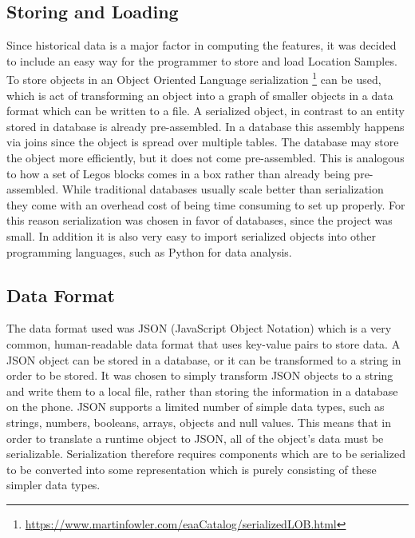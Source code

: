 \subsection{Storing and Loading}
Since historical data is a major factor in computing the features, it was decided to include an easy way for the programmer to store and load Location Samples. To store objects in an Object Oriented Language serialization \footnote{\url{https://www.martinfowler.com/eaaCatalog/serializedLOB.html}} can be used, which is act of transforming an object into a graph of smaller objects in a data format which can be written to a file. A serialized object, in contrast to an entity stored in database is already pre-assembled. In a database this assembly happens via joins since the object is spread over multiple tables. The database may store the object more efficiently, but it does not come pre-assembled. This is analogous to how a set of Legos blocks comes in a box rather than already being pre-assembled. While traditional databases usually scale better than serialization they come with an overhead cost of being time consuming to set up properly. For this reason serialization was chosen in favor of databases,  since the project was small. In addition it is also very easy to import serialized objects into other programming languages, such as Python for data analysis. 

\subsection{Data Format}
The data format used was JSON (JavaScript Object Notation) which is a very common, human-readable data format that uses key-value pairs to store data. A JSON object can be stored in a database, or it can be transformed to a string in order to be stored. It was chosen to simply transform JSON objects to a string and write them to a local file, rather than storing the information in a database on the phone. JSON supports a limited number of simple data types, such as strings, numbers, booleans, arrays, objects and null values. This means that in order to translate a runtime object to JSON, all of the object's data must be serializable. Serialization therefore requires components which are to be serialized to be converted into some representation which is purely consisting of these simpler data types.

